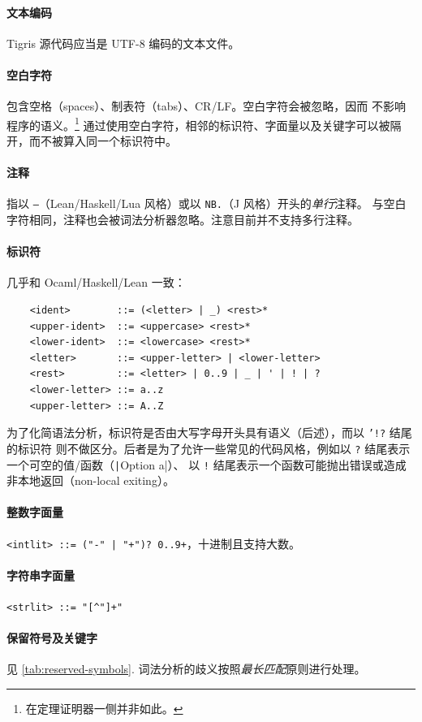\documentclass[a4paper, 11pt]{article}
\theoremstyle{remark}\newtheorem*{remark}{Remark}
\theoremstyle{definition}\newtheorem*{definition}{Definition}
\begin{document}
\paragraph*{文本编码} Tigris 源代码应当是 UTF-8 编码的文本文件。
\paragraph*{空白字符} 包含空格（spaces）、制表符（tabs）、CR/LF。空白字符会被忽略，因而
不影响程序的语义。\footnote{在定理证明器一侧并非如此。}
通过使用空白字符，相邻的标识符、字面量以及关键字可以被隔开，而不被算入同一个标识符中。
\paragraph*{注释} 指以 \texttt{--}（Lean/Haskell/Lua 风格）或以 \texttt{NB.}（J 风格）开头的\emph{单行}注释。
与空白字符相同，注释也会被词法分析器忽略。注意目前并不支持多行注释。

\paragraph*{标识符} 几乎和 Ocaml/Haskell/Lean 一致：
  \begin{verbatim}
    <ident>        ::= (<letter> | _) <rest>*
    <upper-ident>  ::= <uppercase> <rest>*
    <lower-ident>  ::= <lowercase> <rest>*
    <letter>       ::= <upper-letter> | <lower-letter>
    <rest>         ::= <letter> | 0..9 | _ | ' | ! | ?
    <lower-letter> ::= a..z
    <upper-letter> ::= A..Z
  \end{verbatim}

为了化简语法分析，标识符是否由大写字母开头具有语义（后述），而以 \texttt{'!?} 结尾的标识符
则不做区分。后者是为了允许一些常见的代码风格，例如以 \texttt{?} 结尾表示一个可空的值/函数（\texttt|Option a|）、
以 \texttt{!} 结尾表示一个函数可能抛出错误或造成非本地返回（non-local exiting）。

\paragraph*{整数字面量} \texttt{<intlit> ::= ("-" | "+")? 0..9+}，十进制且支持大数。
\paragraph*{字符串字面量} \texttt{<strlit> ::= "[^"]+"}
\paragraph*{保留符号及关键字} 见 \autoref{tab:reserved-symbols}.
词法分析的歧义按照\emph{最长匹配}原则进行处理。
\end{document}
